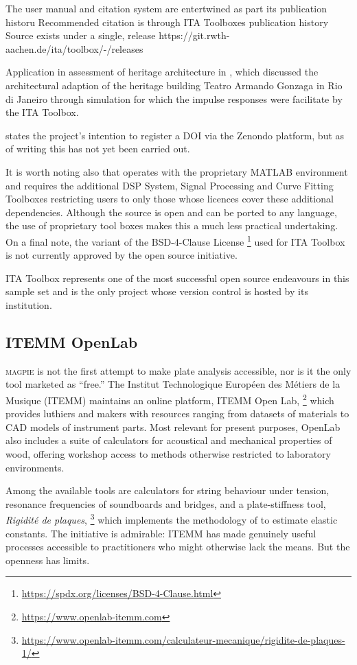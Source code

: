 The user manual and citation system are entertwined as part its publication historu
Recommended citation is through ITA Toolboxes publication history
Source exists under a single, release https://git.rwth-aachen.de/ita/toolbox/-/releases

Application in assessment of heritage architecture in \textcite{fagerlande_adequaccao_2020}, which discussed the architectural adaption of the heritage building Teatro Armando Gonzaga in Rio di Janeiro through simulation for which the impulse responses were facilitate by the ITA Toolbox.  

\textcite{berzborn_ita_2017} states the project's intention to register a DOI via the Zenondo platform, but as of writing this has not yet been carried out.

It is worth noting also that operates with the proprietary MATLAB environment and requires the additional DSP System, Signal Processing  and Curve Fitting Toolboxes restricting users to only those whose licences cover these additional dependencies. Although the source is open and can be ported to any language, the use of proprietary tool boxes makes this a much less practical undertaking. On a final note, the variant of the BSD-4-Clause License
\footnote{\url{https://spdx.org/licenses/BSD-4-Clause.html}}
used for ITA Toolbox is not currently approved by the open source initiative. 


ITA Toolbox represents one of the most successful open source endeavours in this sample set and is the only project whose version control is hosted by its institution.

\subsection{ITEMM OpenLab}

\textsc{magpie} is not the first attempt to make plate analysis accessible, nor is it the only tool marketed as ``free.'' The Institut Technologique Européen des Métiers de la Musique (ITEMM) maintains an online platform, ITEMM Open Lab,%
\footnote{\url{https://www.openlab-itemm.com}} which provides luthiers and makers with resources ranging from datasets of materials to CAD models of instrument parts. Most relevant for present purposes, OpenLab also includes a suite of calculators for acoustical and mechanical properties of wood, offering workshop access to methods otherwise restricted to laboratory environments. 

Among the available tools are calculators for string behaviour under tension, resonance frequencies of soundboards and bridges, and a plate-stiffness tool, \textit{Rigidité de plaques},%
\footnote{\url{https://www.openlab-itemm.com/calculateur-mecanique/rigidite-de-plaques-1/}} which implements the methodology of \textcite{mcintyre_measuring_1988} to estimate elastic constants. The initiative is admirable: ITEMM has made genuinely useful processes accessible to practitioners who might otherwise lack the means. But the openness has limits.

